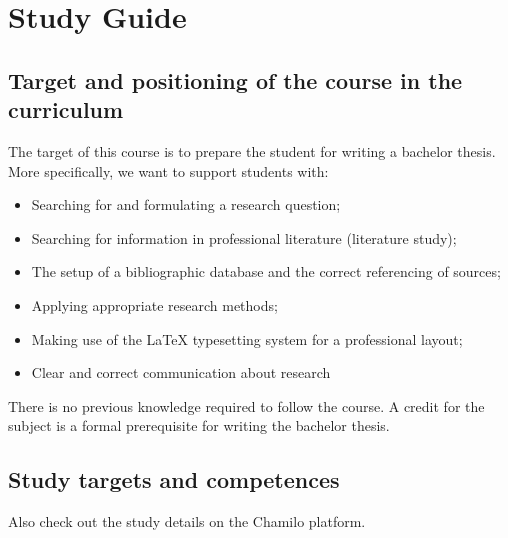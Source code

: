 \chapter*{Study Guide}
\label{ch:studyguide}

\section{Target and positioning of the course in the curriculum}
\label{sec:targetandplace}

The target of this course is to prepare the student for writing a bachelor thesis. More specifically, we want to support students with:

\begin{itemize}
  \item Searching for and formulating a research question;
  \item Searching for information in professional literature (literature study);
  \item The setup of a bibliographic database and the correct referencing of sources; 
  \item Applying appropriate research methods;
  \item Making use of the {\LaTeX} typesetting system for a professional layout;
  \item Clear and correct communication about research
\end{itemize}

There is no previous knowledge required to follow the course. A credit for the subject is a formal prerequisite for writing the bachelor thesis. 

\section{Study targets and competences}
\label{sec:studytargets}

Also check out the study details on the Chamilo platform.

